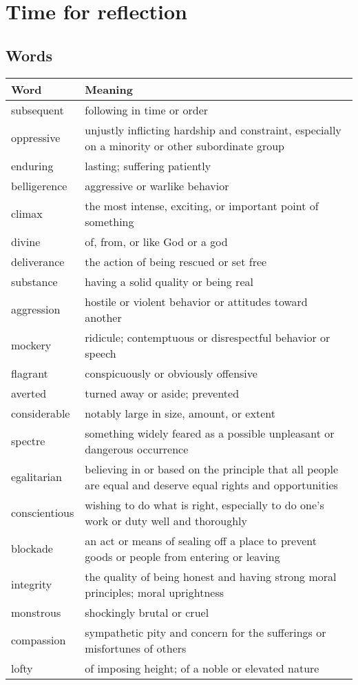\documentclass{article}%
\begin{document}
%
\normalsize%
\section{Time for reflection}%
\label{sec:Timeforreflection}%
\subsection{Words}%
\label{subsec:Words}%
\begin{tabular}{ll}%
Word&Meaning\\%
\hline%
subsequent&following in time or order\\%
oppressive&unjustly inflicting hardship and constraint, especially on a minority or other subordinate group\\%
enduring&lasting; suffering patiently\\%
belligerence&aggressive or warlike behavior\\%
climax&the most intense, exciting, or important point of something\\%
divine&of, from, or like God or a god\\%
deliverance&the action of being rescued or set free\\%
substance&having a solid quality or being real\\%
aggression&hostile or violent behavior or attitudes toward another\\%
mockery&ridicule; contemptuous or disrespectful behavior or speech\\%
flagrant&conspicuously or obviously offensive\\%
averted&turned away or aside; prevented\\%
considerable&notably large in size, amount, or extent\\%
spectre&something widely feared as a possible unpleasant or dangerous occurrence\\%
egalitarian&believing in or based on the principle that all people are equal and deserve equal rights and opportunities\\%
conscientious&wishing to do what is right, especially to do one's work or duty well and thoroughly\\%
blockade&an act or means of sealing off a place to prevent goods or people from entering or leaving\\%
integrity&the quality of being honest and having strong moral principles; moral uprightness\\%
monstrous&shockingly brutal or cruel\\%
compassion&sympathetic pity and concern for the sufferings or misfortunes of others\\%
lofty&of imposing height; of a noble or elevated nature\\%
\end{tabular}
\end{document}
